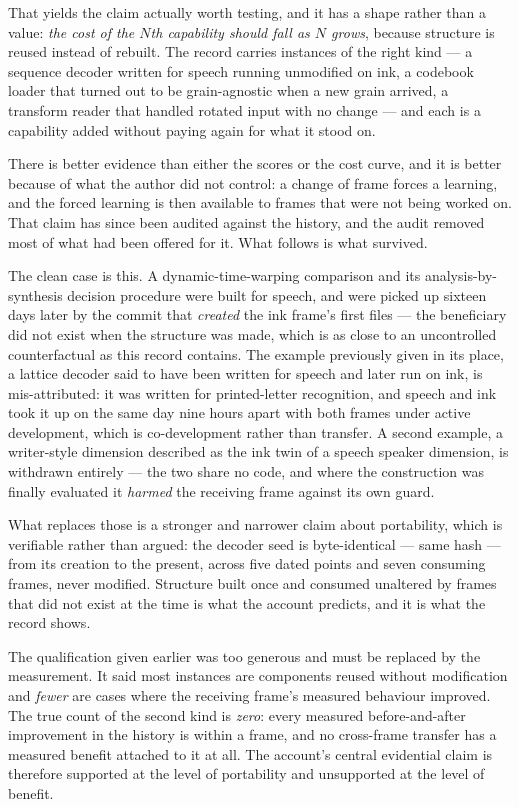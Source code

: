 \documentclass[11pt,a4paper]{article}
\theoremstyle{remark}\newtheorem{remark}[definition]{Remark}
\begin{document}
That yields the claim actually worth testing, and it has a shape rather than a value:
\emph{the cost of the $N$th capability should fall as $N$ grows}, because structure is reused instead
of rebuilt. The record carries instances of the right kind --- a sequence decoder written for speech
running unmodified on ink, a codebook loader that turned out to be grain-agnostic when a new grain
arrived, a transform reader that handled rotated input with no change --- and each is a capability
added without paying again for what it stood on.

There is better evidence than either the scores or the cost curve, and it is better because of what
the author did not control: a change of frame forces a learning, and the forced learning is then
available to frames that were not being worked on. That claim has since been audited against the
history, and the audit removed most of what had been offered for it. What follows is what survived.

The clean case is this. A dynamic-time-warping comparison and its
analysis-by-synthesis decision procedure were built for speech, and were picked up sixteen days later
by the commit that \emph{created} the ink frame's first files --- the beneficiary did not exist when
the structure was made, which is as close to an uncontrolled counterfactual as this record contains.
The example previously given in its place, a lattice decoder said to have been written for speech and
later run on ink, is mis-attributed: it was written for printed-letter recognition, and speech and ink
took it up on the same day nine hours apart with both frames under active development, which is
co-development rather than transfer. A second example, a writer-style dimension described as the ink
twin of a speech speaker dimension, is withdrawn entirely --- the two share no code, and where the
construction was finally evaluated it \emph{harmed} the receiving frame against its own guard.

What replaces those is a stronger and narrower claim about portability, which is verifiable rather than
argued: the decoder seed is byte-identical --- same hash --- from its creation to the present, across
five dated points and seven consuming frames, never modified. Structure built once and consumed
unaltered by frames that did not exist at the time is what the account predicts, and it is what the
record shows.

The qualification given earlier was too generous and must be replaced by the measurement. It said most
instances are components reused without modification and \emph{fewer} are cases where the receiving
frame's measured behaviour improved. The true count of the second kind is \emph{zero}: every measured
before-and-after improvement in the history is within a frame, and no cross-frame transfer has a
measured benefit attached to it at all. The account's central evidential claim is therefore supported at
the level of portability and unsupported at the level of benefit.
\end{document}
